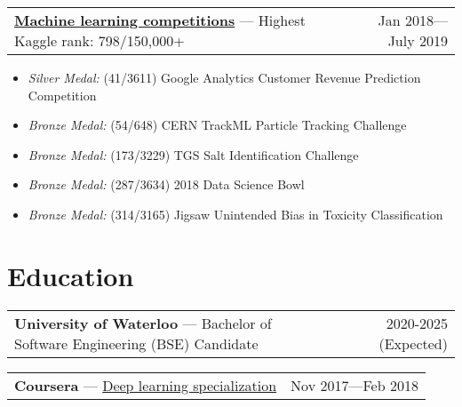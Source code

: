 \documentclass[letterpaper,11pt]{article}
\makeatletter
\newcommand{\heading}[3]{
    \begin{tabular*}{\textwidth}{l@{\extracolsep{\fill}}r}
        \textbf{#1} — #2 & #3
    \end{tabular*}
    \vspace{-1em}
}
\newcommand{\items}[1]{
    \begin{itemize}[topsep=0pt,leftmargin=1em]\itemsep0em
        #1
    \end{itemize}
}
\makeatother
\begin{document}
    \vspace{5pt}

    \heading{\href{https://www.kaggle.com/bkkaggle}{Machine learning competitions}}{Highest Kaggle rank: 798/150,000+}{Jan 2018—July 2019}
    \items{
        \item \textit{Silver Medal:} (41/3611) Google Analytics Customer Revenue Prediction Competition
        \item \textit{Bronze Medal:} (54/648) CERN TrackML Particle Tracking Challenge
        \item \textit{Bronze Medal:} (173/3229) TGS Salt Identification Challenge
        \item \textit{Bronze Medal:} (287/3634) 2018 Data Science Bowl
        \item \textit{Bronze Medal:} (314/3165) Jigsaw Unintended Bias in Toxicity Classification
    }

\vspace{10pt}

\section{Education}
    \heading{University of Waterloo}{Bachelor of Software Engineering (BSE) Candidate}{2020-2025 (Expected)}
    \vspace{7pt}
    \heading{Coursera}{\href{https://coursera.org/share/f01a288c4d93810dbfe43cba754c64c3}{Deep learning specialization}}{Nov 2017—Feb 2018}
\end{document}
